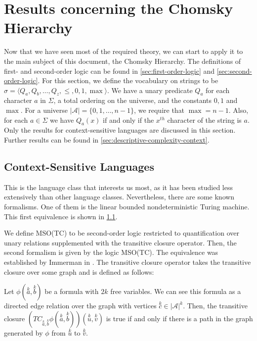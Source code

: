 \section{Results concerning the Chomsky Hierarchy}\label{sec:results-concerning-the-chomsky-hierarchy}


Now that we have seen most of the required theory, we can start to apply it to the main subject of this document, the Chomsky Hierarchy.
The definitions of first- and second-order logic can be found in \cref{sec:first-order-logic} and \cref{sec:second-order-logic}.
For this section, we define the vocabulary on strings to be $\sigma = \langle Q_a, Q_b, \dots, Q_z, \leq , 0, 1, \max \rangle$.
We have a unary predicate $Q_a$ for each character $a$ in $\Sigma$, a total ordering on the universe, and the constants $0, 1$ and $\max$.
For a universe $| \mathcal{A} | = \{0, 1, \dots, n - 1\}$, we require that $\max = n - 1$.
Also, for each $a \in \Sigma$ we have $Q_a(x)$ if and only if the $x^{th}$ character of the string is $a$.
Only the results for context-sensitive languages are discussed in this section.
Further results can be found in \cref{sec:descriptive-complexity-context}.

\subsection{Context-Sensitive Languages}\label{subsec:des-context-sensitive-languages}

This is the language class that interests us most, as it has been studied less extensively than other language classes.
Nevertheless, there are some known formalisms.
One of them is the linear bounded nondeterministic Turing machine.
This first equivalence is shown in \cref{subsec:des-context-sensitive-languages}.

We define MSO(TC) to be second-order logic restricted to quantification over unary relations supplemented with the transitive closure operator.
Then, the second formalism is given by the logic MSO(TC).
The equivalence was established by Immerman in \cite{Immerman1987}.
The transitive closure operator takes the transitive closure over some graph and is defined as follows:

\begin{define}
    Let $\phi\left(\overset{k}{a}, \overset{k}{b}\right)$ be a formula with $2k$ free variables.
    We can see this formula as a directed edge relation over the graph with vertices $\overset{k}{c} \in | \mathcal{A} |^{k}$.
    Then, the transitive closure $\left(TC_{\overset{k}{a}, \overset{k}{b}}\phi\left(\overset{k}{a}, \overset{k}{b}\right)\right)\left(\overset{k}{u}, \overset{k}{v}\right)$ is true if and only if there is a path in the graph generated by $\phi$ from $\overset{k}{u}$ to $\overset{k}{v}$.
\end{define}

